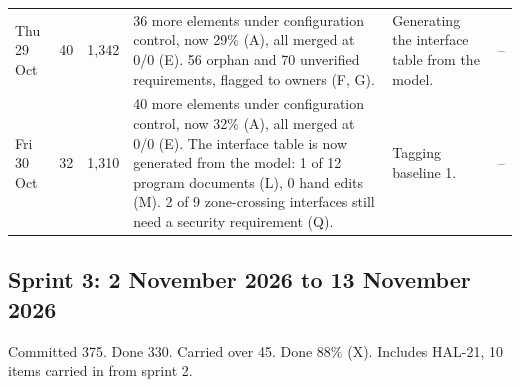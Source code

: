 \documentclass[12pt,letterpaper,oneside]{article}
\begin{document}
{\begin{longtable}{@{}>{\raggedright}p{} r r >{\raggedright}p{} >{\raggedright}p{} >{\raggedright\arraybackslash}p{}@{}}
Thu 29 Oct & 40 & 1,342 & 36 more elements under configuration control, now 29\% (A), all merged at 0/0 (E). 56 orphan and 70 unverified requirements, flagged to owners (F, G). & Generating the interface table from the model. & -- \\
Fri 30 Oct & 32 & 1,310 & 40 more elements under configuration control, now 32\% (A), all merged at 0/0 (E). The interface table is now generated from the model: 1 of 12 program documents (L), 0 hand edits (M). 2 of 9 zone-crossing interfaces still need a security requirement (Q). & Tagging baseline 1. & -- \\
\end{longtable}}
\subsection{Sprint 3: 2 November 2026 to 13 November 2026}
Committed 375. Done 330. Carried over 45. Done 88\% (X). Includes HAL-21, 10 items carried in from sprint 2.
\end{document}
